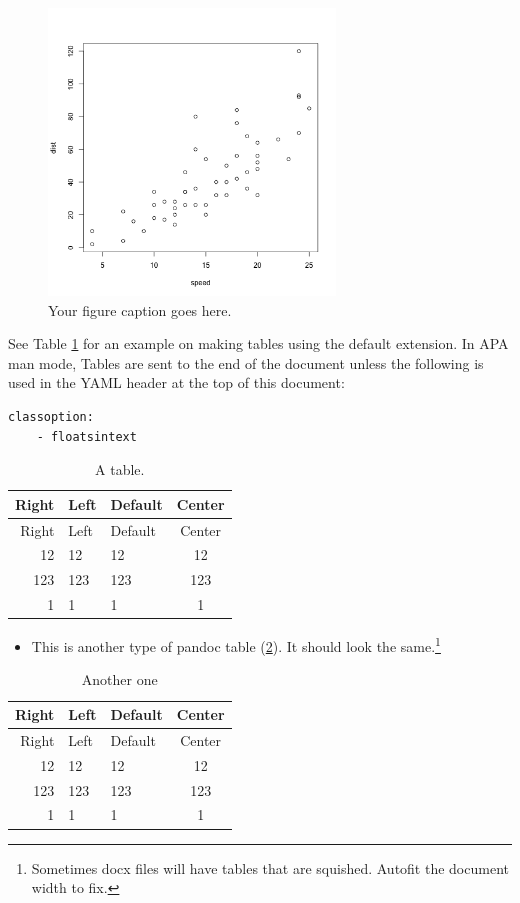 \documentclass[doc,longtable]{apa6}
\let\tightlist\relax %
\begin{document}
\begin{figure}
\centering
\includegraphics[width=3.00000in]{example/plot.png}
\caption{Your figure caption goes here.\label{fig:myplot}}
\end{figure}

See Table \ref{tbl:mytable} for an example on making tables using the default extension. In APA man mode, Tables are sent to the end of the document unless the following is used in the YAML header at the top of this document:

\begin{verbatim}
classoption:
    - floatsintext
\end{verbatim}

\begin{longtable}[]{@{}rllc@{}}
\caption{A table. \label{tbl:mytable}}\tabularnewline
\toprule
Right & Left & Default & Center\tabularnewline
\midrule
\endfirsthead
\toprule
Right & Left & Default & Center\tabularnewline
\midrule
\endhead
12 & 12 & 12 & 12\tabularnewline
123 & 123 & 123 & 123\tabularnewline
1 & 1 & 1 & 1\tabularnewline
\bottomrule
\end{longtable}

\begin{itemize}
\tightlist
\item
  This is another type of pandoc table (\ref{tbl:anotherone}). It should look the same.\footnote{Sometimes docx files will have tables that are squished. Autofit the document width to fix.}
\end{itemize}

\begin{longtable}[]{@{}rllc@{}}
\caption{Another one \label{tbl:anotherone}}\tabularnewline
\toprule
Right & Left & Default & Center\tabularnewline
\midrule
\endfirsthead
\toprule
Right & Left & Default & Center\tabularnewline
\midrule
\endhead
12 & 12 & 12 & 12\tabularnewline
123 & 123 & 123 & 123\tabularnewline
1 & 1 & 1 & 1\tabularnewline
\bottomrule
\end{longtable}
\end{document}
